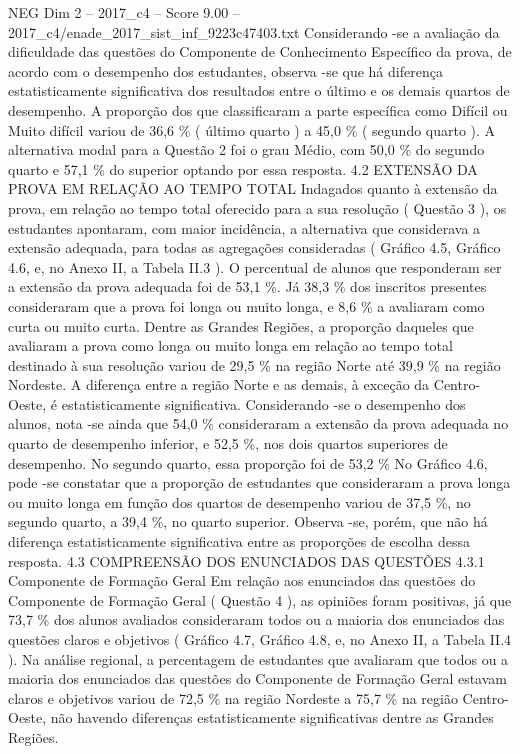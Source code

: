 \begin{textsample}{NEG Dim 2 – 2017\_c4 – Score 9.00 – 2017\_c4/enade\_2017\_sist\_inf\_9223c47403.txt}
Considerando -se a avaliação da dificuldade das questões do Componente de Conhecimento Específico da prova, de acordo com o desempenho dos estudantes, observa -se que há diferença estatisticamente significativa dos resultados entre o último e os demais quartos de desempenho.
A proporção dos que classificaram a parte específica como Difícil ou Muito difícil variou de 36,6 \% ( último quarto ) a 45,0 \% ( segundo quarto ).
A alternativa modal para a Questão 2 foi o grau Médio, com 50,0 \% do segundo quarto e 57,1 \% do superior optando por essa resposta. 4.2 EXTENSÃO DA PROVA EM RELAÇÃO AO TEMPO TOTAL Indagados quanto à extensão da prova, em relação ao tempo total oferecido para a sua resolução ( Questão 3 ), os estudantes apontaram, com maior incidência, a alternativa que considerava a extensão adequada, para todas as agregações consideradas ( Gráfico 4.5, Gráfico 4.6, e, no Anexo II, a Tabela II.3 ).
O percentual de alunos que responderam ser a extensão da prova adequada foi de 53,1 \%.
Já 38,3 \% dos inscritos presentes consideraram que a prova foi longa ou muito longa, e 8,6 \% a avaliaram como curta ou muito curta.
Dentre as Grandes Regiões, a proporção daqueles que avaliaram a prova como longa ou muito longa em relação ao tempo total destinado à sua resolução variou de 29,5 \% na região Norte até 39,9 \% na região Nordeste.
A diferença entre a região Norte e as demais, à exceção da Centro-Oeste, é estatisticamente significativa.
Considerando -se o desempenho dos alunos, nota -se ainda que 54,0 \% consideraram a extensão da prova adequada no quarto de desempenho inferior, e 52,5 \%, nos dois quartos superiores de desempenho.
No segundo quarto, essa proporção foi de 53,2 \% No Gráfico 4.6, pode -se constatar que a proporção de estudantes que consideraram a prova longa ou muito longa em função dos quartos de desempenho variou de 37,5 \%, no segundo quarto, a 39,4 \%, no quarto superior.
Observa -se, porém, que não há diferença estatisticamente significativa entre as proporções de escolha dessa resposta. 4.3 COMPREENSÃO DOS ENUNCIADOS DAS QUESTÕES 4.3.1 Componente de Formação Geral Em relação aos enunciados das questões do Componente de Formação Geral ( Questão 4 ), as opiniões foram positivas, já que 73,7 \% dos alunos avaliados consideraram todos ou a maioria dos enunciados das questões claros e objetivos ( Gráfico 4.7, Gráfico 4.8, e, no Anexo II, a Tabela II.4 ).
Na análise regional, a percentagem de estudantes que avaliaram que todos ou a maioria dos enunciados das questões do Componente de Formação Geral estavam claros e objetivos variou de 72,5 \% na região Nordeste a 75,7 \% na região Centro-Oeste, não havendo diferenças estatisticamente significativas dentre as Grandes Regiões.

\end{textsample}
